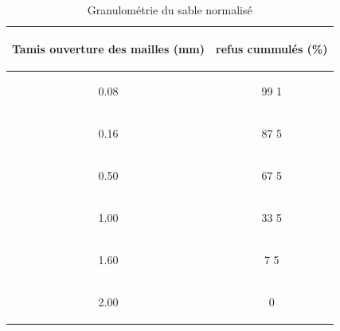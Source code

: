 \documentclass{DGC_M2_report}
\begin{document}
\begin{table}[h]
\begin{center}
\begin{tabular}{cc}
\hline
\begin{bf}Tamis ouverture des mailles (mm)\end{bf}   &   \begin{bf}refus cummulés (\%)\end{bf} \\
\hline 
\begin{bf}\rowcolor{cyan}0.08\end{bf}   &   \begin{bf}99 \pm{}1 \end{bf} \\ 
\begin{bf}0.16\end{bf}   &   \begin{bf}87 \pm{}5\end{bf} \\
\begin{bf}\rowcolor{cyan}0.50\end{bf}   &   \begin{bf}67 \pm{}5\end{bf} \\
\begin{bf}1.00\end{bf}   &   \begin{bf}33 \pm{}5\end{bf} \\
\begin{bf}\rowcolor{cyan}1.60\end{bf}   &   \begin{bf}7 \pm{}5\end{bf} \\
\begin{bf}2.00\end{bf}   &   \begin{bf}0\end{bf} \\
\hline 
\end{tabular}
\end{center}
\caption{Granulométrie du sable normalisé}
\label{sable}
\end{table}
\end{document}
